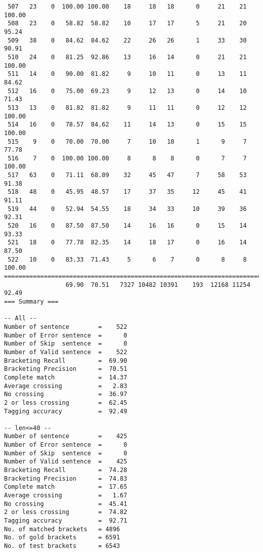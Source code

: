 \begin{verbatim}
 507   23    0  100.00 100.00    18     18   18      0     21    21   100.00
 508   23    0   58.82  58.82    10     17   17      5     21    20    95.24
 509   38    0   84.62  84.62    22     26   26      1     33    30    90.91
 510   24    0   81.25  92.86    13     16   14      0     21    21   100.00
 511   14    0   90.00  81.82     9     10   11      0     13    11    84.62
 512   16    0   75.00  69.23     9     12   13      0     14    10    71.43
 513   13    0   81.82  81.82     9     11   11      0     12    12   100.00
 514   16    0   78.57  84.62    11     14   13      0     15    15   100.00
 515    9    0   70.00  70.00     7     10   10      1      9     7    77.78
 516    7    0  100.00 100.00     8      8    8      0      7     7   100.00
 517   63    0   71.11  68.09    32     45   47      7     58    53    91.38
 518   48    0   45.95  48.57    17     37   35     12     45    41    91.11
 519   44    0   52.94  54.55    18     34   33     10     39    36    92.31
 520   16    0   87.50  87.50    14     16   16      0     15    14    93.33
 521   18    0   77.78  82.35    14     18   17      0     16    14    87.50
 522   10    0   83.33  71.43     5      6    7      0      8     8   100.00
============================================================================
                 69.90  70.51   7327 10482 10391    193  12168 11254    92.49
=== Summary ===

-- All --
Number of sentence        =    522
Number of Error sentence  =      0
Number of Skip  sentence  =      0
Number of Valid sentence  =    522
Bracketing Recall         =  69.90
Bracketing Precision      =  70.51
Complete match            =  14.37
Average crossing          =   2.83
No crossing               =  36.97
2 or less crossing        =  62.45
Tagging accuracy          =  92.49

-- len<=40 --
Number of sentence        =    425
Number of Error sentence  =      0
Number of Skip  sentence  =      0
Number of Valid sentence  =    425
Bracketing Recall         =  74.28
Bracketing Precision      =  74.83
Complete match            =  17.65
Average crossing          =   1.67
No crossing               =  45.41
2 or less crossing        =  74.82
Tagging accuracy          =  92.71
No. of matched brackets   = 4896
No. of gold brackets      = 6591
No. of test brackets      = 6543

\end{verbatim}

\normalsize

